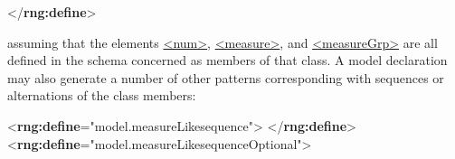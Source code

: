 \begin{shaded}
{</\textbf{rng:define}>}\end{shaded}\egroup\par \noindent  assuming that the elements \hyperref[TEI.num]{<num>}, \hyperref[TEI.measure]{<measure>}, and \hyperref[TEI.measureGrp]{<measureGrp>} are all defined in the schema concerned as members of that class. A model declaration may also generate a number of other patterns corresponding with sequences or alternations of the class members:  \par\bgroup\exampleFont \begin{shaded}\noindent\mbox{}{<\textbf{rng:define}\hspace*{1em}{name}="{model.measureLike\textunderscore sequence}">}\mbox{}\newline 
{}\mbox{}\newline 
{}\mbox{}\newline 
{}\mbox{}\newline 
{</\textbf{rng:define}>}\mbox{}\newline 
{<\textbf{rng:define}\hspace*{1em}{name}="{model.measureLike\textunderscore sequenceOptional}">}\mbox{}\newline 
{}\mbox{}\newline 
\hspace*{1em}\mbox{}\newline 
{}\mbox{}\newline 
{}\mbox{}\newline 
\hspace*{1em}\mbox{}\newline 
{}\mbox{}\newline 

\end{shaded}
